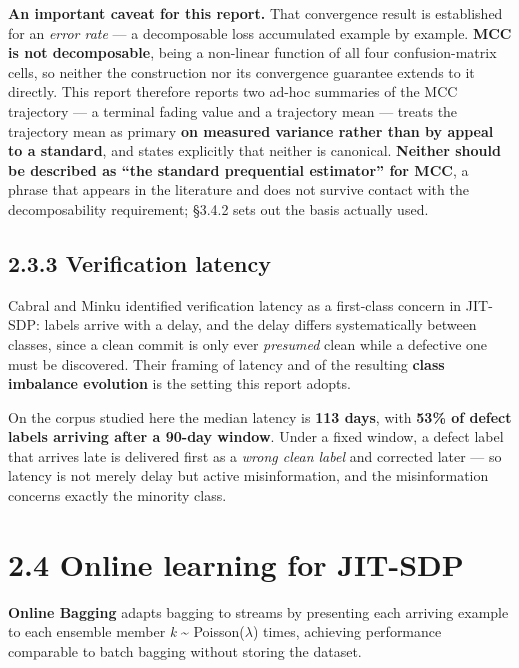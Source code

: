 \textbf{An important caveat for this report.} That convergence result is
established for an \emph{error rate} --- a decomposable loss accumulated
example by example. \textbf{MCC is not decomposable}, being a non-linear
function of all four confusion-matrix cells, so neither the construction
nor its convergence guarantee extends to it directly. This report
therefore reports two ad-hoc summaries of the MCC trajectory --- a
terminal fading value and a trajectory mean --- treats the trajectory
mean as primary \textbf{on measured variance rather than by appeal to a
standard}, and states explicitly that neither is canonical.
\textbf{Neither should be described as ``the standard prequential
estimator'' for MCC}, a phrase that appears in the literature and does
not survive contact with the decomposability requirement; \S{}3.4.2 sets
out the basis actually used.

\subsection{2.3.3 Verification latency}\label{verification-latency}

Cabral and Minku \citep{cabral2019orb} identified verification latency
as a first-class concern in JIT-SDP: labels arrive with a delay, and the
delay differs systematically between classes, since a clean commit is
only ever \emph{presumed} clean while a defective one must be
discovered. Their framing of latency and of the resulting \textbf{class
imbalance evolution} is the setting this report adopts.

On the corpus studied here the median latency is \textbf{113 days}, with
\textbf{53\% of defect labels arriving after a 90-day window}. Under a
fixed window, a defect label that arrives late is delivered first as a
\emph{wrong clean label} and corrected later --- so latency is not
merely delay but active misinformation, and the misinformation concerns
exactly the minority class.

\section{2.4 Online learning for
JIT-SDP}\label{online-learning-for-jit-sdp}

\textbf{Online Bagging} \citep{oza2001onlinebagging} adapts bagging to
streams by presenting each arriving example to each ensemble member
\emph{k} \textasciitilde{} Poisson(\ensuremath{\lambda}) times, achieving performance
comparable to batch bagging without storing the dataset.

